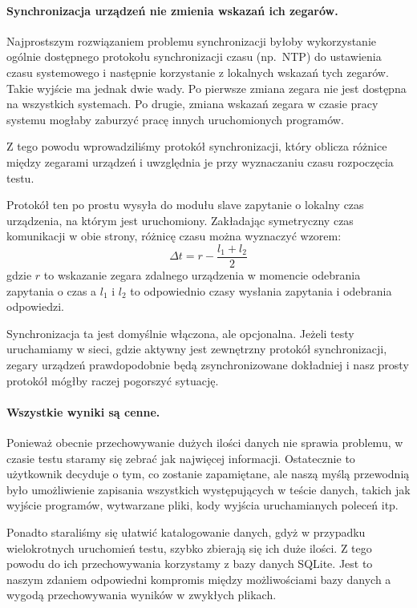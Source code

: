 \documentclass[00-praca-magisterska.tex]{subfiles}
\begin{document}
\paragraph{Synchronizacja urządzeń nie zmienia wskazań ich zegarów.}
Najprostszym rozwiązaniem problemu synchronizacji byłoby wykorzystanie ogólnie
dostępnego protokołu synchronizacji czasu (np.~NTP) do ustawienia czasu
systemowego i następnie korzystanie z lokalnych wskazań tych zegarów. Takie
wyjście ma jednak dwie wady. Po pierwsze zmiana zegara nie jest dostępna na
wszystkich systemach. Po drugie, zmiana wskazań zegara w czasie pracy systemu
mogłaby zaburzyć pracę innych uruchomionych programów.

Z tego powodu wprowadziliśmy protokół synchronizacji, który oblicza różnice
między zegarami urządzeń i uwzględnia je przy wyznaczaniu czasu rozpoczęcia
testu.

Protokół ten po prostu wysyła do modułu slave zapytanie o lokalny czas
urządzenia, na którym jest uruchomiony. Zakładając symetryczny czas komunikacji
w obie strony, różnicę czasu można wyznaczyć wzorem: $$\Delta t = r - \frac{l_1
+ l_2}{2}$$ gdzie $r$ to wskazanie zegara zdalnego urządzenia w momencie
odebrania zapytania o czas a $l_1$ i $l_2$ to odpowiednio czasy wysłania
zapytania i odebrania odpowiedzi.

Synchronizacja ta jest domyślnie włączona, ale opcjonalna. Jeżeli testy
uruchamiamy w sieci, gdzie aktywny jest zewnętrzny protokół synchronizacji,
zegary urządzeń prawdopodobnie będą zsynchronizowane dokładniej i nasz prosty
protokół mógłby raczej pogorszyć sytuację.

\paragraph{Wszystkie wyniki są cenne.} Ponieważ obecnie przechowywanie dużych
ilości danych nie sprawia problemu, w czasie testu staramy się zebrać jak
najwięcej informacji. Ostatecznie to użytkownik decyduje o tym, co zostanie
zapamiętane, ale naszą myślą przewodnią było umożliwienie zapisania wszystkich
występujących w teście danych, takich jak wyjście programów, wytwarzane pliki,
kody wyjścia uruchamianych poleceń itp.

Ponadto staraliśmy się ułatwić katalogowanie danych, gdyż w przypadku
wielokrotnych uruchomień testu, szybko zbierają się ich duże ilości. Z tego
powodu do ich przechowywania korzystamy z bazy danych SQLite. Jest to naszym
zdaniem odpowiedni kompromis między możliwościami bazy danych a wygodą
przechowywania wyników w zwykłych plikach.
\end{document}
